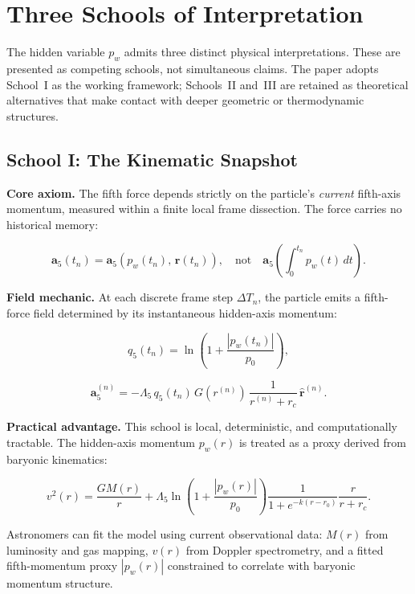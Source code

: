 \documentclass[11pt,a4paper]{article}
\newcommand{\pw}{p_w}                        %
\newcommand{\Lf}{\Lambda_5}                  %
\newcommand{\afive}{\mathbf{a}_5}            %
\newcommand{\rhat}{\hat{\mathbf{r}}}         %
\begin{document}
\section{Three Schools of Interpretation}\label{sec:schools}

The hidden variable $\pw$ admits three distinct physical interpretations.
These are presented as competing schools, not simultaneous claims.  The
paper adopts School~I as the working framework; Schools~II and~III are
retained as theoretical alternatives that make contact with deeper geometric
or thermodynamic structures.

\subsection{School I: The Kinematic Snapshot}\label{sec:school1}

\textbf{Core axiom.} The fifth force depends strictly on the particle's
\emph{current} fifth-axis momentum, measured within a finite local frame
dissection.  The force carries no historical memory:

\[
  \afive(t_n) = \afive\!\left(\pw(t_n),\,\mathbf{r}(t_n)\right) ,
  \quad \text{not} \quad
  \afive\!\left(\int_0^{t_n} \pw(t)\,dt\right) .
\]

\textbf{Field mechanic.} At each discrete frame step $\Delta T_n$, the
particle emits a fifth-force field determined by its instantaneous hidden-axis
momentum:

\[
  q_5(t_n) = \ln\!\left(1+\frac{|\pw(t_n)|}{p_0}\right) ,
\]

\[
  \mathbf{a}_5^{(n)} = -\Lf\,q_5(t_n)\,G(r^{(n)})\,\frac{1}{r^{(n)}+r_c}\,\rhat^{(n)} .
\]

\textbf{Practical advantage.} This school is local, deterministic, and
computationally tractable.  The hidden-axis momentum $\pw(r)$ is treated as
a proxy derived from baryonic kinematics:

\[
  v^2(r) = \frac{GM(r)}{r} + \Lf\ln\!\left(1+\frac{|\pw(r)|}{p_0}\right)
  \frac{1}{1+e^{-k(r-r_0)}} \frac{r}{r+r_c} .
\]

Astronomers can fit the model using current observational data: $M(r)$ from
luminosity and gas mapping, $v(r)$ from Doppler spectrometry, and a fitted
fifth-momentum proxy $|\pw(r)|$ constrained to correlate with baryonic
momentum structure.
\end{document}
